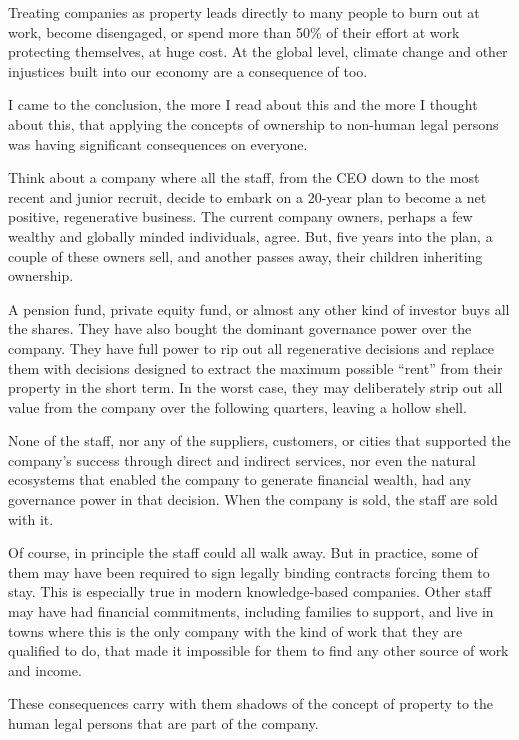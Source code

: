 Treating companies as property leads directly to many people to burn out at work, become disengaged, or spend more than 50\% of their effort at work protecting themselves, at huge cost. At the global level, climate change and other injustices built into our economy are a consequence of too.


I came to the conclusion, the more I read about this and the more I thought about this, that applying the concepts of ownership to non-human legal persons was having significant  consequences on everyone.


Think about a company where all the staff, from the CEO down to the most recent and junior recruit, decide to embark on a 20-year plan to become a net positive, regenerative business. The current company owners, perhaps a few wealthy and globally minded individuals, agree. But, five years into the plan, a couple of these owners sell, and another passes away, their children inheriting ownership.


A pension fund, private equity fund, or almost any other kind of investor buys all the shares. They have also bought the dominant governance power over the company. They have full power to rip out all regenerative decisions and replace them with decisions designed to extract the maximum possible “rent” from their property in the short term. In the worst case, they may deliberately strip out all value from the company over the following quarters, leaving a hollow shell.


None of the staff, nor any of the suppliers, customers, or cities that supported the company's success through direct and indirect services, nor even the natural ecosystems that enabled the company to generate financial wealth, had any governance power in that decision. When the company is sold, the staff are sold with it. 


Of course, in principle the staff could all walk away. But in practice, some of them may have been required to sign legally binding contracts forcing them to stay. This is especially true in modern knowledge-based companies. Other staff may have had financial commitments, including families to support, and live in towns where this is the only company with the kind of work that they are qualified to do, that made it impossible for them to find any other source of work and income.


These consequences carry with them shadows of the concept of property to the human legal persons that are part of the company.


